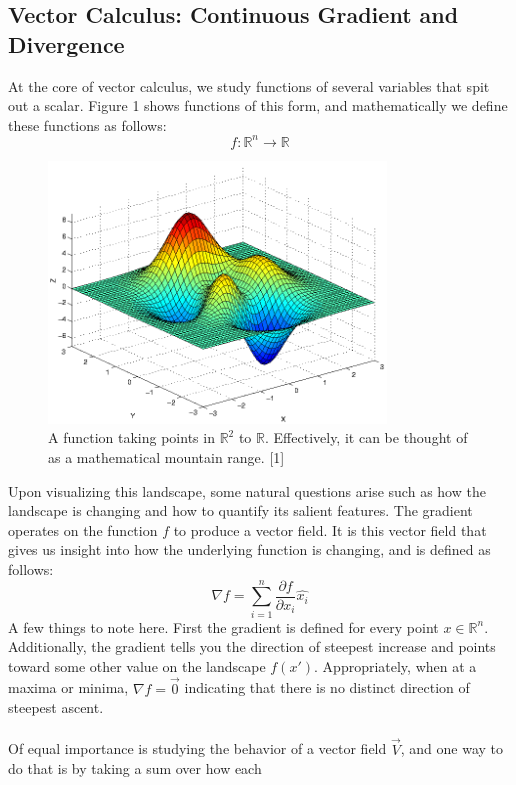 \subsection{Vector Calculus: Continuous Gradient and Divergence}
At the core of vector calculus, we study functions of several
variables that spit out a scalar. Figure 1 shows functions of this
form, and mathematically we define these functions as follows: 
\[
f: \mathbb{R}^n \rightarrow \mathbb{R}
\]
\begin{figure}[ht]
\centering
\includegraphics[width=0.8\textwidth, height=0.2\textheight]{chapter_3/files/peaks.png}
\caption{A function taking points in \(\mathbb{R}^2\) to
  \(\mathbb{R}\). Effectively, it can be thought of as a mathematical
  mountain range. [1]} 
\label{fig:circle}
\end{figure}
Upon visualizing this landscape, some natural questions arise such as
how the landscape is changing and how to quantify its salient
features. The gradient operates on the function \(f\) to produce a
vector field. It is this vector field that gives us insight into how
the underlying function is changing, and is defined as follows: 
\[
\nabla f = \sum_{i=1}^n \frac{\partial f}{\partial x_i} \hat{x_i}
\]
A few things to note here. First the gradient is defined for every
point \(x \in \mathbb{R}^n\). Additionally, the gradient tells you the
direction of steepest increase and points toward some other value on
the landscape \(f(x')\). Appropriately, when at a maxima or minima,
\(\nabla f = \vec{0}\) indicating that there is no distinct direction
of steepest ascent. 
\\\\
Of equal importance is studying the behavior of a vector field
\(\vec{V}\), and one way to do that is by taking a sum over how each
